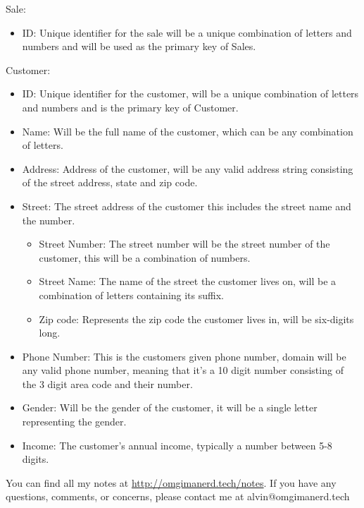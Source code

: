 \documentclass{math}
\begin{document}
Sale:
\begin{itemize}
  \item ID: Unique identifier for the sale will be a unique combination of
    letters and numbers and will be used as the primary key of Sales.
\end{itemize}
Customer:
\begin{itemize}
  \item ID: Unique identifier for the customer, will be a unique combination of
    letters and numbers and is the primary key of Customer.
  \item Name: Will be the full name of the customer, which can be any
    combination of letters.
  \item Address: Address of the customer, will be any valid address string
    consisting of the street address, state and zip code.
  \item Street: The street address of the customer this includes the street
    name and the number.
  \begin{itemize}
    \item Street Number: The street number will be the street number of the
      customer, this will be a combination of numbers.
    \item Street Name: The name of the street the customer lives on, will be a
      combination of letters containing its suffix.
    \item Zip code: Represents the zip code the customer lives in, will be
      six-digits long.
  \end{itemize}
  \item Phone Number: This is the customers given phone number, domain will be
    any valid phone number, meaning that it’s a 10 digit number consisting of
    the 3 digit area code and their number.
  \item Gender: Will be the gender of the customer, it will be a single letter
    representing the gender.
  \item Income: The customer’s annual income, typically a number between 5-8
    digits.
\end{itemize}

\begin{center}
  You can find all my notes at \url{http://omgimanerd.tech/notes}. If you have
  any questions, comments, or concerns, please contact me at
  alvin@omgimanerd.tech
\end{center}
\end{document}
